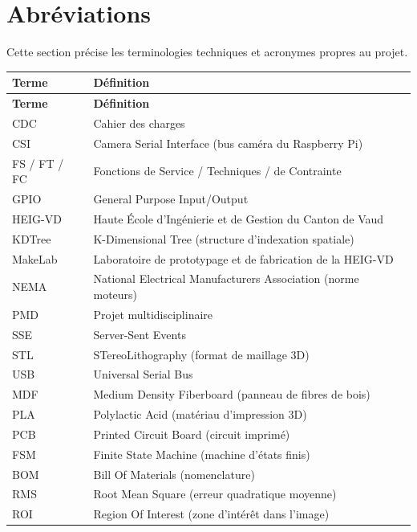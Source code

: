 \section*{Abréviations}

Cette section précise les terminologies techniques et acronymes propres
au projet.

\begin{longtable}{@{}p{2.7cm}p{12.7cm}@{}}
\toprule
\textbf{Terme} & \textbf{Définition} \\
\midrule
\endfirsthead
\toprule
\textbf{Terme} & \textbf{Définition} \\
\midrule
\endhead
CDC      & Cahier des charges \\
CSI      & Camera Serial Interface (bus caméra du Raspberry Pi) \\
FS / FT / FC & Fonctions de Service / Techniques / de Contrainte \\
GPIO     & General Purpose Input/Output \\
HEIG-VD  & Haute École d'Ingénierie et de Gestion du Canton de Vaud \\
KDTree   & K-Dimensional Tree (structure d'indexation spatiale) \\
MakeLab  & Laboratoire de prototypage et de fabrication de la HEIG-VD \\
NEMA     & National Electrical Manufacturers Association (norme moteurs) \\
PMD      & Projet multidisciplinaire \\
SSE      & Server-Sent Events \\
STL      & STereoLithography (format de maillage 3D) \\
USB      & Universal Serial Bus \\
MDF      & Medium Density Fiberboard (panneau de fibres de bois) \\
PLA      & Polylactic Acid (matériau d'impression 3D) \\
PCB      & Printed Circuit Board (circuit imprimé) \\
FSM      & Finite State Machine (machine d'états finis) \\
BOM      & Bill Of Materials (nomenclature) \\
RMS      & Root Mean Square (erreur quadratique moyenne) \\
ROI      & Region Of Interest (zone d'intérêt dans l'image) \\
\bottomrule
\end{longtable}
